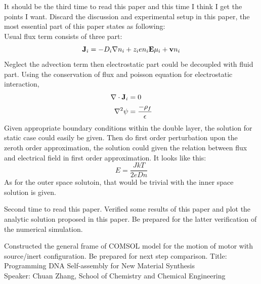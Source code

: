 \documentclass[fontsize=11pt, %
                             paper=a4, %
                             twoside, %
                             captions=tableheading,
                             index=totoc,
                             hyperref]{labbook}
\begin{document}
\begin{addmargin}[4cm]{0cm}
It should be the third time to read this paper and this time I think I get the points I want. Discard the discussion and experimental setup in this paper, the most essential part of this paper states as following:\\
Usual flux term consists of three part:
\begin{equation}
\mathbf{J}_i=-D_i \nabla n_i +z_i e n_i \mathbf{E} \mu_i + \mathbf{v} n_i
\end{equation}
Neglect the advection term then electrostatic part could be decoupled with fluid part. Using the conservation of flux and poisson equation for electrostatic interaction, 
\begin{equation}
\begin{aligned}
\nabla \cdot \mathbf{J}_i &=0\\
\nabla^2 \psi &= \frac{-\rho_f}{\epsilon}
\end{aligned}
\end{equation}
Given appropriate boundary conditions within the double layer, the solution for static case could easily be given. Then do first order perturbation upon the zeroth order approximation, the solution could given the relation between flux and electrical field in first order approximation. It looks like this:
\begin{equation}
E=\frac{J kT}{2eDn}
\end{equation}
As for the outer space solutoin, that would be trivial with the inner space solution is given.

Second time to read this paper. Verified some results of this paper and plot the analytic solution proposed in this paper. Be prepared for the latter verification of the numerical simulation.

Constructed the general frame of COMSOL model for the motion of motor with source/inert configuration. Be prepared for next step comparison.
Title: Programming DNA Self-assembly for New Material Synthesis\\
Speaker: Chuan Zhang, School of Chemistry and Chemical Engineering


\end{addmargin}
\end{document}
